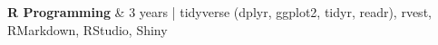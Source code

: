 \textbf{R Programming} & 
3 years | 
tidyverse (dplyr, ggplot2, tidyr, readr), 
rvest, 
RMarkdown, 
RStudio, 
Shiny 